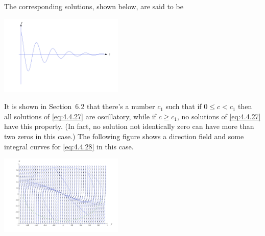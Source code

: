 \documentclass{ximera}
\begin{document}
The corresponding solutions, shown below, are said to be  

\begin{image}
 \includegraphics[height=1.5in]{fig040413.jpg} 
\end{image}


It is shown in
Section~6.2 that there's a number $c_1$ such that if $0\leq
c<c_1$ then  all solutions of \eqref{eq:4.4.27} are oscillatory, while if
$c\geq c_1$,  no solutions of \eqref{eq:4.4.27} have this property. (In
fact, no solution not identically zero can have more than two zeros in
this case.) The following figure shows a direction field and
some integral curves for \eqref{eq:4.4.28} in this case.

\begin{image}
 \includegraphics[height=1.5in]{fig040414.jpg} 
\end{image}
\end{document}

